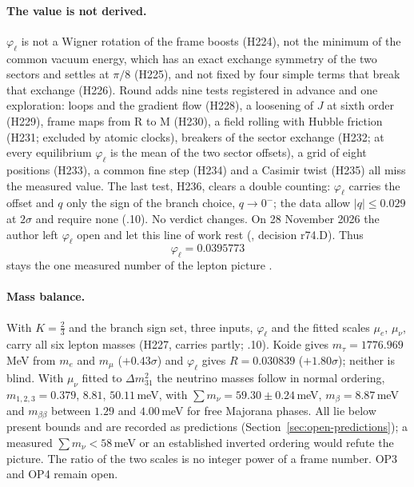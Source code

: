 \paragraph{The value is not derived.} $\varphi_\ell$ is not a Wigner rotation of the frame boosts (H224), not the minimum of the common
vacuum energy, which has an exact exchange symmetry of the two sectors and settles at $\pi/8$ (H225), and not fixed by four simple terms
that break that exchange (H226). Round  adds nine tests registered in advance and one exploration: loops and the gradient flow
(H228), a loosening of $J$ at sixth order (H229), frame maps from R to M (H230), a field rolling with Hubble friction (H231; excluded by
atomic clocks), breakers of the sector exchange (H232; at every equilibrium $\varphi_\ell$ is the mean of the two sector offsets), a grid of
eight positions (H233), a common fine step (H234) and a Casimir twist (H235) all miss the measured value. The last test, H236, clears a
double counting: $\varphi_\ell$ carries the offset and $q$ only the sign of the branch choice, $q\to0^-$; the data allow $|q|\le0.029$
at $2\sigma$ and require none (.10). No verdict changes. On 28 November 2026 the author left $\varphi_\ell$ open and let this
line of work rest (, decision r74.D). Thus
\begin{equation}
 \varphi_\ell=0.0395773
 \label{eq:B-phi-measured}
\end{equation}
stays the one measured number of the lepton picture \Open.

\paragraph{Mass balance.} With $K=\tfrac23$ and the branch sign set, three inputs, $\varphi_\ell$ and the fitted scales $\mu_e$,
$\mu_\nu$, carry all six lepton masses (H227, carries partly; .10). Koide gives $m_\tau=1776.969$\,MeV from $m_e$ and $m_\mu$
($+0.43\sigma$) and $\varphi_\ell$ gives $R=0.030839$ ($+1.80\sigma$); neither is blind. With $\mu_\nu$ fitted to $\Delta m^2_{31}$
the neutrino masses follow in normal ordering, $m_{1,2,3}=0.379$, $8.81$, $50.11$\,meV, with $\sum m_\nu=59.30\pm0.24$\,meV,
$m_\beta=8.87$\,meV and $m_{\beta\beta}$ between $1.29$ and $4.00$\,meV for free Majorana phases. All lie below present bounds and are
recorded as predictions (Section~\ref{sec:open-predictions}); a measured $\sum m_\nu<58$\,meV or an established inverted ordering would
refute the picture. The ratio of the two scales is no integer power of a frame number. OP3 and OP4 remain open.

